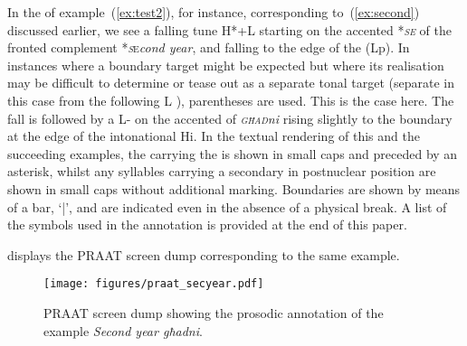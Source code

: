 \documentclass[output=paper]{LSP/langsci}
\begin{document}
  
In the  of example~(\ref{ex:test2}), for instance,
corresponding to~(\ref{ex:second}) discussed earlier, we see a falling
tune H*+L starting on the accented  *{\textsc{\textit {se}}}
of the fronted complement *{\textsc{\textit se}}{\it cond year}, and
falling to the edge of the   (Lp). In instances where a
boundary target might be expected but where its realisation may be
difficult to determine or tease out as a separate tonal target
(separate in this case from the following L ),
parentheses are used. This is the case here.  The fall is followed by
a  L- on the accented  of {\textsc{\textit
    {għad}}}{\it ni} rising slightly to the boundary at the edge of
the intonational  Hi. In the textual rendering of this and the
succeeding examples, the  carrying the  is
shown in small caps and preceded by an asterisk, whilst any syllables
carrying a secondary  in postnuclear position are shown in small
caps without additional marking. Boundaries are shown by means of a
bar, ‘|’, and are indicated even in the absence of a physical break. A
list of the symbols used in the annotation is provided at the end of this paper.

 
 

 displays the PRAAT screen dump
corresponding to the same example.

\begin{figure}
\texttt{[image: figures/praat\_secyear.pdf]}
\caption{PRAAT screen dump showing the prosodic annotation of the example {\em Second year għadni}.}
\label{fig:praatex1}
\end{figure}
\end{document}
